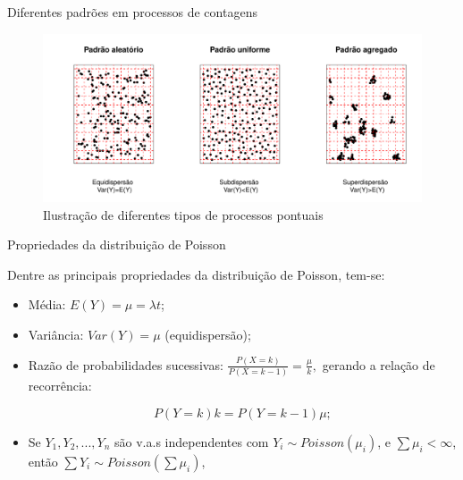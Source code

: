 \documentclass[10pt, aspectratio=169]{beamer}
\begin{document}



\begin{frame}{Diferentes padrões em processos de contagens}
    
\begin{figure}[h]
    \includegraphics[scale=0.6]{images/processos14.pdf}
    \caption{Ilustração de diferentes tipos de processos pontuais}
    \label{Fig2}
    \centering
    
\end{figure}
\end{frame}



\begin{frame}{Propriedades da distribuição de Poisson}

Dentre as principais propriedades da distribuição de Poisson, tem-se:

\vspace{0,3cm}

\begin{itemize}

    \item Média: $E(Y)=\mu = \lambda t$;
    \vspace{0,5cm}
    
    \item Variância: $Var(Y)=\mu$ (equidispersão);
    \vspace{0,5cm}
    
    \item Razão de probabilidades sucessivas: $\frac{P\left ( X=k \right )}{P\left ( X=k-1 \right )}=\frac{\mu}{k},$ gerando a relação de recorrência:
    
    $$
        P(Y=k)k=P(Y=k-1)\mu;
    $$
    
    \item Se $Y_{1},Y_{2},...,Y_{n}$ são v.a.s independentes com $Y_{i}\sim Poisson(\mu_{i})$, e $\sum\mu_{i}<\infty$, então $\sum Y_{i}\sim Poisson(\sum\mu_{i})$,
    
    \end{itemize}
\end{frame}
\end{document}
